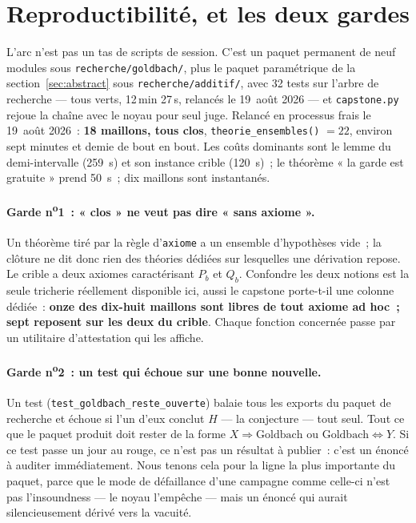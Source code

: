 \documentclass[11pt]{article}
\theoremstyle{remark}\newtheorem{remarque}{Remarque}
\begin{document}
\section{Reproductibilité, et les deux gardes}
\label{sec:repro}

L'arc n'est pas un tas de scripts de session. C'est un paquet permanent de neuf modules
sous \texttt{recherche/goldbach/}, plus le paquet paramétrique de la
section~\ref{sec:abstract} sous \texttt{recherche/additif/}, avec 32 tests sur l'arbre de
recherche --- tous verts, 12\,min 27\,s, relancés le 19~août 2026 --- et
\texttt{capstone.py} rejoue la chaîne avec le noyau pour seul juge. Relancé en processus
frais le 19~août 2026~: \textbf{18 maillons, tous clos}, \texttt{theorie\_ensembles()}
$= 22$, environ sept minutes et demie de bout en bout. Les coûts dominants sont le lemme
du demi-intervalle (259~s) et son instance crible (120~s)~; le théorème « la garde est
gratuite » prend 50~s~; dix maillons sont instantanés.

\paragraph{Garde n\textsuperscript{o}1~: « clos » ne veut pas dire « sans axiome ».} Un
théorème tiré par la règle d'\texttt{axiome} a un ensemble d'hypothèses vide~; la clôture
ne dit donc rien des théories dédiées sur lesquelles une dérivation repose. Le crible a
deux axiomes caractérisant $P_b$ et $Q_b$. Confondre les deux notions est la seule
tricherie réellement disponible ici, aussi le capstone porte-t-il une colonne dédiée~:
\textbf{onze des dix-huit maillons sont libres de tout axiome ad hoc~; sept reposent sur
les deux du crible}. Chaque fonction concernée passe par un utilitaire d'attestation qui
les affiche.

\paragraph{Garde n\textsuperscript{o}2~: un test qui échoue sur une bonne nouvelle.} Un
test (\texttt{test\_goldbach\_reste\_ouverte}) balaie tous les exports du paquet de
recherche et échoue si l'un d'eux conclut $H$ --- la conjecture --- tout seul. Tout ce que
le paquet produit doit rester de la forme $X \Rightarrow \mathrm{Goldbach}$ ou
$\mathrm{Goldbach} \Leftrightarrow Y$. Si ce test passe un jour au rouge, ce n'est pas un
résultat à publier~: c'est un énoncé à auditer immédiatement. Nous tenons cela pour la
ligne la plus importante du paquet, parce que le mode de défaillance d'une campagne comme
celle-ci n'est pas l'insoundness --- le noyau l'empêche --- mais un énoncé qui aurait
silencieusement dérivé vers la vacuité.
\end{document}
